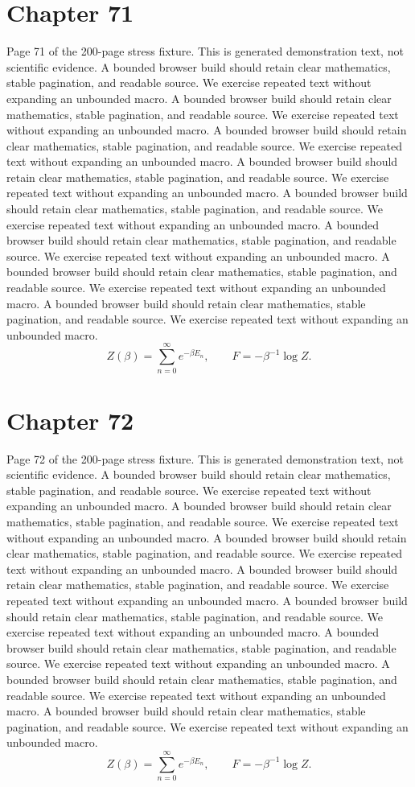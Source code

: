 \documentclass[11pt]{article}
\begin{document}
\section*{Chapter 71}
Page 71 of the 200-page stress fixture. This is generated demonstration text, not scientific evidence.
A bounded browser build should retain clear mathematics, stable pagination, and readable source. We exercise repeated text without expanding an unbounded macro.
A bounded browser build should retain clear mathematics, stable pagination, and readable source. We exercise repeated text without expanding an unbounded macro.
A bounded browser build should retain clear mathematics, stable pagination, and readable source. We exercise repeated text without expanding an unbounded macro.
A bounded browser build should retain clear mathematics, stable pagination, and readable source. We exercise repeated text without expanding an unbounded macro.
A bounded browser build should retain clear mathematics, stable pagination, and readable source. We exercise repeated text without expanding an unbounded macro.
A bounded browser build should retain clear mathematics, stable pagination, and readable source. We exercise repeated text without expanding an unbounded macro.
A bounded browser build should retain clear mathematics, stable pagination, and readable source. We exercise repeated text without expanding an unbounded macro.
A bounded browser build should retain clear mathematics, stable pagination, and readable source. We exercise repeated text without expanding an unbounded macro.
\[Z(\beta)=\sum_{n=0}^{\infty}e^{-\beta E_n},\qquad F=-\beta^{-1}\log Z.\]
\newpage
\section*{Chapter 72}
Page 72 of the 200-page stress fixture. This is generated demonstration text, not scientific evidence.
A bounded browser build should retain clear mathematics, stable pagination, and readable source. We exercise repeated text without expanding an unbounded macro.
A bounded browser build should retain clear mathematics, stable pagination, and readable source. We exercise repeated text without expanding an unbounded macro.
A bounded browser build should retain clear mathematics, stable pagination, and readable source. We exercise repeated text without expanding an unbounded macro.
A bounded browser build should retain clear mathematics, stable pagination, and readable source. We exercise repeated text without expanding an unbounded macro.
A bounded browser build should retain clear mathematics, stable pagination, and readable source. We exercise repeated text without expanding an unbounded macro.
A bounded browser build should retain clear mathematics, stable pagination, and readable source. We exercise repeated text without expanding an unbounded macro.
A bounded browser build should retain clear mathematics, stable pagination, and readable source. We exercise repeated text without expanding an unbounded macro.
A bounded browser build should retain clear mathematics, stable pagination, and readable source. We exercise repeated text without expanding an unbounded macro.
\[Z(\beta)=\sum_{n=0}^{\infty}e^{-\beta E_n},\qquad F=-\beta^{-1}\log Z.\]
\newpage
\end{document}
